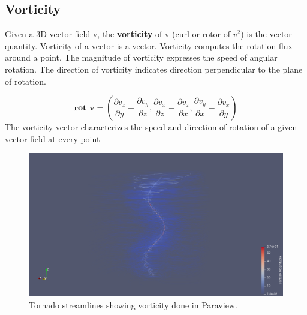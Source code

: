 \documentclass{article}
\begin{document}
\subsection*{Vorticity}
Given a 3D vector field v, the \textbf{vorticity} of v (curl or rotor of $v^2$) is the vector quantity. Vorticity of a vector is a vector. Vorticity computes the rotation flux around a point. The magnitude of vorticity expresses the speed of angular rotation. The direction of vorticity indicates direction perpendicular to the plane of rotation.

\begin{equation}
    \textbf{rot v} = (\frac{\partial v_z}{\partial y} - \frac{\partial v_y}{\partial z}, \frac{\partial v_x}{\partial z} - \frac{\partial v_z}{\partial x}, \frac{\partial v_y}{\partial x} - \frac{\partial v_x}{\partial y})
\end{equation}
The vorticity vector characterizes the speed and direction of rotation of a given vector field at every point

\begin{figure}[H]
\caption{Tornado streamlines showing vorticity
done in Paraview.}
\centering
\includegraphics[scale=.35]{tornado_vorticity_streamlines_pv.png}
\end{figure}
\end{document}
